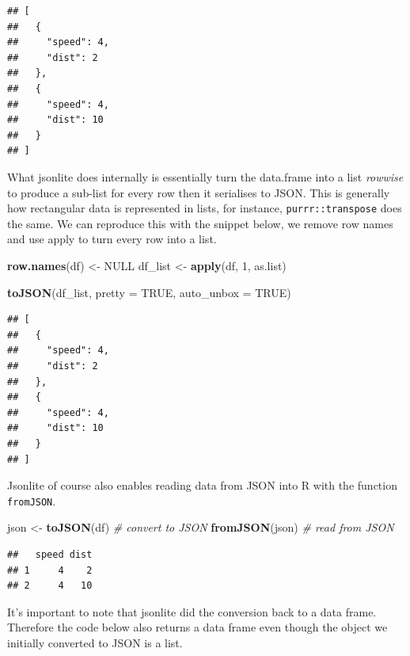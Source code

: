 \documentclass[
]{krantz}
\makeatletter
\newenvironment{Shaded}{\begin{snugshade}}{\end{snugshade}}
\newcommand{\CommentTok}[1]{\textcolor[rgb]{0.37,0.37,0.37}{\textit{#1}}}
\newcommand{\DataTypeTok}[1]{\textcolor[rgb]{0.27,0.27,0.27}{#1}}
\newcommand{\DecValTok}[1]{\textcolor[rgb]{0.06,0.06,0.06}{#1}}
\newcommand{\KeywordTok}[1]{\textcolor[rgb]{0.27,0.27,0.27}{\textbf{#1}}}
\newcommand{\NormalTok}[1]{#1}
\newcommand{\OtherTok}[1]{\textcolor[rgb]{0.37,0.37,0.37}{#1}}
\newcommand{\StringTok}[1]{\textcolor[rgb]{0.5,0.5,0.5}{#1}}
\newenvironment{kframe}{%
\medskip{}
\setlength{\fboxsep}{.8em}
 \def\at@end@of@kframe{}%
 \ifinner\ifhmode%
  \def\at@end@of@kframe{\end{minipage}}%
  \begin{minipage}{\columnwidth}%
 \fi\fi%
 \def\FrameCommand##1{\hskip\@totalleftmargin \hskip-\fboxsep
 \colorbox{shadecolor}{##1}\hskip-\fboxsep
     \hskip-\linewidth \hskip-\@totalleftmargin \hskip\columnwidth}%
 \MakeFramed {\advance\hsize-\width
   \@totalleftmargin\z@ \linewidth\hsize
   \@setminipage}}%
 {\par\unskip\endMakeFramed%
 \at@end@of@kframe}
\renewenvironment{Shaded}{\begin{kframe}}{\end{kframe}}
\makeatother
\begin{document}
\begin{verbatim}
## [
##   {
##     "speed": 4,
##     "dist": 2
##   },
##   {
##     "speed": 4,
##     "dist": 10
##   }
## ]
\end{verbatim}

What jsonlite does internally is essentially turn the data.frame into a list \emph{rowwise} to produce a sub-list for every row then it serialises to JSON. This is generally how rectangular data is represented in lists, for instance, \texttt{purrr::transpose} does the same. We can reproduce this with the snippet below, we remove row names and use apply to turn every row into a list.

\begin{Shaded}
\begin{Highlighting}[]
\KeywordTok{row.names}\NormalTok{(df) \textless{}{-}}\StringTok{ }\OtherTok{NULL}
\NormalTok{df\_list \textless{}{-}}\StringTok{ }\KeywordTok{apply}\NormalTok{(df, }\DecValTok{1}\NormalTok{, as.list)}

\KeywordTok{toJSON}\NormalTok{(df\_list, }\DataTypeTok{pretty =} \OtherTok{TRUE}\NormalTok{, }\DataTypeTok{auto\_unbox =} \OtherTok{TRUE}\NormalTok{)}
\end{Highlighting}
\end{Shaded}

\begin{verbatim}
## [
##   {
##     "speed": 4,
##     "dist": 2
##   },
##   {
##     "speed": 4,
##     "dist": 10
##   }
## ]
\end{verbatim}

Jsonlite of course also enables reading data from JSON into R with the function \texttt{fromJSON}.

\begin{Shaded}
\begin{Highlighting}[]
\NormalTok{json \textless{}{-}}\StringTok{ }\KeywordTok{toJSON}\NormalTok{(df) }\CommentTok{\# convert to JSON}
\KeywordTok{fromJSON}\NormalTok{(json) }\CommentTok{\# read from JSON}
\end{Highlighting}
\end{Shaded}

\begin{verbatim}
##   speed dist
## 1     4    2
## 2     4   10
\end{verbatim}

It's important to note that jsonlite did the conversion back to a data frame. Therefore the code below also returns a data frame even though the object we initially converted to JSON is a list.
\end{document}
